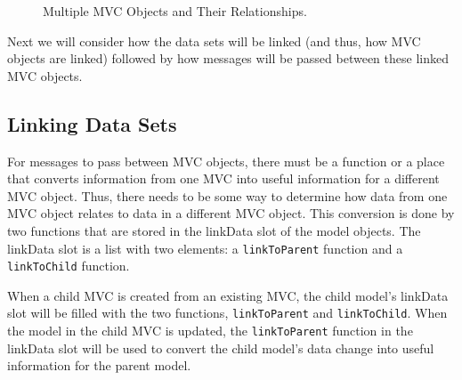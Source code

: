 \documentclass{article}[11pt]
\newcommand{\Rfunction}[1]{{\texttt{#1}}}
\begin{document}
\begin{figure}[ht]
  \begin{center}
    \caption{ Multiple MVC Objects and Their Relationships. }
    \label{Fig:SmallHier}
  \end{center}
\end{figure}

Next we will consider how the data sets will be linked (and thus, how MVC
objects are linked) followed by how messages will be passed between these
linked MVC objects. 

\subsection{Linking Data Sets}\label{Ssec:MultLink}

For messages to pass between MVC objects, there must be a function or a place
that converts information from one MVC into useful information for a different
MVC object.  Thus, there needs to be some way to determine how data from one
MVC object relates to data in a different MVC object.  This conversion is done
by two functions that are stored in the linkData slot of the model objects.
The linkData slot is a list with two elements: a \Rfunction{linkToParent}
function and a \Rfunction{linkToChild} function.  

When a child MVC is created from an existing MVC, the child model's linkData
slot will be filled with the two functions, \Rfunction{linkToParent} and
\Rfunction{linkToChild}.  When the model in the child MVC is updated, the
\Rfunction{linkToParent} function in the linkData slot will be used to convert
the child model's data change into useful information for the parent model.  
\end{document}
